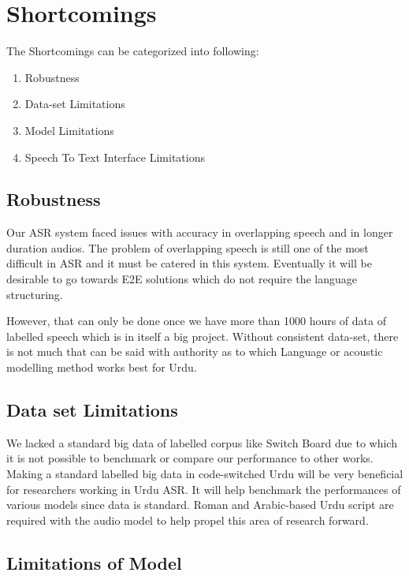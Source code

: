 \section{Shortcomings}
\label{sec:shortcomings}
The Shortcomings can be categorized into following:
\begin{enumerate}
    \item Robustness 
    \item Data-set Limitations
    \item Model Limitations
    \item Speech To Text Interface Limitations
\end{enumerate}

\subsection{Robustness}
Our ASR system faced issues with accuracy in overlapping speech and in longer duration audios. The problem of overlapping speech  is still one of the most difficult in ASR \cite{chen_progressive_2018} and it must be catered in this system. Eventually it will be desirable to go towards E2E solutions which do not require the language structuring. 
\par
However, that can only be done once we have more than 1000 hours of data of labelled speech which is in itself a big project. Without consistent data-set, there is not much that can be said with authority as to which Language or acoustic modelling method works best for Urdu. 
\par 


\subsection{Data set Limitations}
We lacked a standard big data of labelled corpus like Switch Board \cite{godfrey_switchboard_1992} due to which it is not possible to benchmark or compare our performance to other works. Making a standard labelled big data in code-switched Urdu will be very beneficial for researchers working in Urdu ASR. It will help benchmark the performances of various models since data is standard. Roman and Arabic-based Urdu script are required with the audio model to help propel this area of research forward.

\subsection{Limitations of Model}

